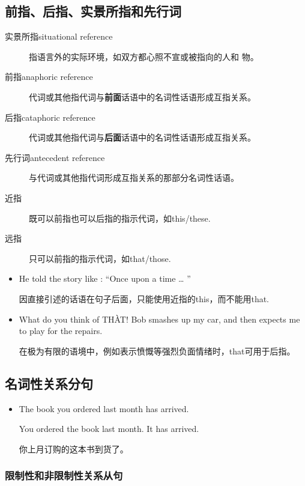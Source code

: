 \subsection{前指、后指、实景所指和先行词}
\label{sub:anacata}

\begin{description}
\item[实景所指situational reference] 指语言外的实际环境，如双方都心照不宣或被指向的人和
  物。
\item[前指anaphoric reference] 代词或其他指代词与\textbf{前面}话语中的名词性话语形成互指关系。
\item[后指cataphoric reference] 代词或其他指代词与\textbf{后面}话语中的名词性话语形成互指关系。
\item[先行词antecedent reference] 与代词或其他指代词形成互指关系的那部分名词性话语。
\item[近指] 既可以前指也可以后指的指示代词，如this/these.
\item[远指] 只可以前指的指示代词，如that/those.
\end{description}

\begin{itemize}

\item He told the story like : ``Once upon a time \ldots{} ''

  因直接引述的话语在句子后面，只能使用近指的this，而不能用that.

\item What do you think of TH\`{A}T! Bob smashes up my car, and then expects me to
  play for the repairs.

  在极为有限的语境中，例如表示愤慨等强烈负面情绪时，that可用于后指。
\end{itemize}

\subsection{名词性关系分句}

\begin{itemize}
\item The book  you ordered last month has arrived.

  You ordered the book last month. It has arrived.

  你上月订购的这本书到货了。
\end{itemize}

\subsubsection{限制性和非限制性关系从句}

